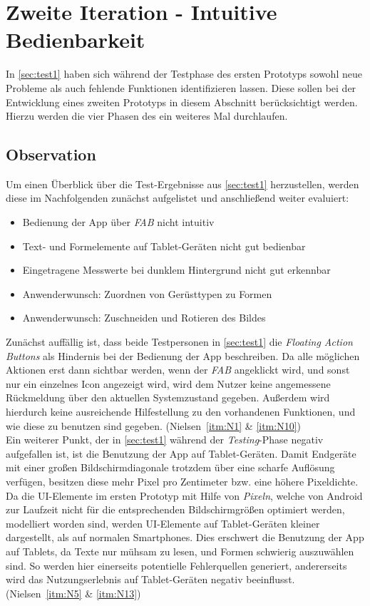\chapter{Zweite Iteration - Intuitive Bedienbarkeit}\label{chap:pro2}
In \autoref{sec:test1} haben sich während der Testphase des ersten Prototyps sowohl neue Probleme als auch fehlende Funktionen identifizieren lassen.
Diese sollen bei der Entwicklung eines zweiten Prototyps in diesem Abschnitt berücksichtigt werden. 
Hierzu werden die vier Phasen des \hcdp{} ein weiteres Mal durchlaufen.

\section{Observation}
Um einen Überblick über die Test-Ergebnisse aus \autoref{sec:test1} herzustellen, werden diese im Nachfolgenden zunächst aufgelistet und anschließend weiter evaluiert:

\begin{itemize}
  \item Bedienung der App über \emph{FAB} nicht intuitiv
  \item Text- und Formelemente auf Tablet-Geräten nicht gut bedienbar
  \item Eingetragene Messwerte bei dunklem Hintergrund nicht gut erkennbar
  \item Anwenderwunsch: Zuordnen von Gerüsttypen zu Formen
  \item Anwenderwunsch: Zuschneiden und Rotieren des Bildes
\end{itemize}

\noindent
Zunächst auffällig ist, dass beide Testpersonen in \autoref{sec:test1} die \emph{Floating Action Buttons} als Hindernis bei der Bedienung der App beschreiben.
Da alle möglichen Aktionen erst dann sichtbar werden, wenn der \emph{FAB} angeklickt wird, und sonst nur ein einzelnes Icon angezeigt wird, wird dem Nutzer keine angemessene Rückmeldung über den aktuellen Systemzustand gegeben.
Außerdem wird hierdurch keine ausreichende Hilfestellung zu den vorhandenen Funktionen, und wie diese zu benutzen sind gegeben.
(Nielsen~\autoref{itm:N1} \& \autoref{itm:N10}) \\

Ein weiterer Punkt, der in \autoref{sec:test1} während der \emph{Testing}-Phase negativ aufgefallen ist, ist die Benutzung der App auf Tablet-Geräten.
Damit Endgeräte mit einer großen Bildschirmdiagonale trotzdem über eine scharfe Auflösung verfügen, besitzen diese mehr Pixel pro Zentimeter bzw. eine höhere Pixeldichte.
Da die UI-Elemente im ersten Prototyp mit Hilfe von \emph{Pixeln}, welche von Android zur Laufzeit nicht für die entsprechenden Bildschirmgrößen optimiert werden, modelliert worden sind, werden UI-Elemente auf Tablet-Geräten kleiner dargestellt, als auf normalen Smartphones.
Dies erschwert die Benutzung der App auf Tablets, da Texte nur mühsam zu lesen, und Formen schwierig auszuwählen sind.
So werden hier einerseits potentielle Fehlerquellen generiert, andererseits wird das Nutzungserlebnis auf Tablet-Geräten negativ beeinflusst.
(Nielsen~\autoref{itm:N5} \& \autoref{itm:N13}) \\

